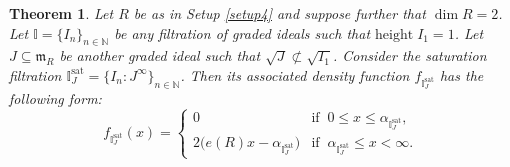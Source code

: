 \documentclass[12pt,a4paper]{amsart}
\theoremstyle{plain}
\newtheorem{theorem}{Theorem}[section]
\theoremstyle{definition}
\numberwithin{equation}{theorem}
\begin{document}
\begin{theorem}\label{dimension_two}
 Let $R$ be as in Setup \ref{setup4} and suppose further that $\dim R =2$. Let $\mathbb{I} = \{I_n\}_{n\in\mathbb{N}}$ be any filtration of graded ideals such that $\mathrm{height}\;I_1 = 1$. Let $J\subseteq \mathfrak{m}_R$ be another graded ideal such that $\sqrt{J}\not\subset \sqrt{I_1}$. Consider the saturation filtration $\mathbb{I}^{\mathrm{sat}}_J = \{I_n \colon J^{\infty}\}_{n\in\mathbb{N}}$. Then its associated density function $f_{\mathbb{I}^{\mathrm{sat}}_J}$ has the following form:
 $$f_{\mathbb{I}^{\mathrm{sat}}_J}(x) = \begin{cases}
                                         0 & \text{if}\;\;0\leq x\leq \alpha_{\mathbb{I}^{\mathrm{sat}}_J},\\
                                         2\big(e(R)x-\alpha_{\mathbb{I}^{\mathrm{sat}}_J}\big) & \text{if}\;\;\alpha_{\mathbb{I}^{\mathrm{sat}}_J} \leq x<\infty.
                                        \end{cases}
$$
\end{theorem}
\end{document}
